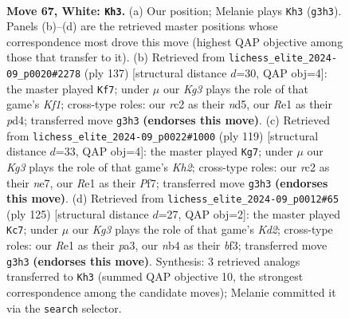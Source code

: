 \documentclass[11pt]{article}
\begin{document}
\clearpage

\begin{figure}[p]\centering
\begin{subfigure}{0.46\textwidth}\centering
\resizebox{\linewidth}{!}{%
\newchessgame
\chessboard[
  setfen={3R4/1p5p/1k4pP/p4p2/1n3P2/6K1/2r5/4R3 w - - 21 67},
  showmover=false,
  pgfstyle=straightmove, color=movearrow, markmove={g3-h3}
]}
\caption{}
\end{subfigure}\hfill
\begin{subfigure}{0.46\textwidth}\centering
\resizebox{\linewidth}{!}{%
\newchessgame
\chessboard[
  setfen={5k1K/7P/p7/P2N4/2pP4/2P5/1P6/8 b - - 0 69},
  showmover=false,
  pgfstyle=straightmove, color=movearrow, markmove={f8-f7}
]}
\caption{}
\end{subfigure}
\\[4pt]
\begin{subfigure}{0.46\textwidth}\centering
\resizebox{\linewidth}{!}{%
\newchessgame
\chessboard[
  setfen={8/4Np1k/7p/P1n3pP/8/5KP1/5P2/8 b - - 2 60},
  showmover=false,
  pgfstyle=straightmove, color=movearrow, markmove={h7-g7}
]}
\caption{}
\end{subfigure}\hfill
\begin{subfigure}{0.46\textwidth}\centering
\resizebox{\linewidth}{!}{%
\newchessgame
\chessboard[
  setfen={8/3k4/1p2p3/4P3/1KPP4/P4B2/1P6/1b6 b - - 4 63},
  showmover=false,
  pgfstyle=straightmove, color=movearrow, markmove={d7-c7}
]}
\caption{}
\end{subfigure}
\caption{\textbf{Move 67, White: \texttt{Kh3}.} (a) Our position; Melanie plays \texttt{Kh3} (\texttt{g3h3}). Panels (b)--(d) are the retrieved master positions whose correspondence most drove this move (highest QAP objective among those that transfer to it). (b) Retrieved from \texttt{lichess\_elite\_2024-09\_p0020\#2278} (ply 137) [structural distance $d$=30, QAP obj=4]: the master played \texttt{Kf7}; under $\mu$ our \emph{Kg3} plays the role of that game's \emph{Kf1}; cross-type roles: our \emph{r}c2 as their \emph{n}d5, our \emph{R}e1 as their \emph{p}d4; transferred move \texttt{g3h3} \textbf{(endorses this move)}. (c) Retrieved from \texttt{lichess\_elite\_2024-09\_p0022\#1000} (ply 119) [structural distance $d$=33, QAP obj=4]: the master played \texttt{Kg7}; under $\mu$ our \emph{Kg3} plays the role of that game's \emph{Kh2}; cross-type roles: our \emph{r}c2 as their \emph{n}e7, our \emph{R}e1 as their \emph{P}f7; transferred move \texttt{g3h3} \textbf{(endorses this move)}. (d) Retrieved from \texttt{lichess\_elite\_2024-09\_p0012\#65} (ply 125) [structural distance $d$=27, QAP obj=2]: the master played \texttt{Kc7}; under $\mu$ our \emph{Kg3} plays the role of that game's \emph{Kd2}; cross-type roles: our \emph{R}e1 as their \emph{p}a3, our \emph{n}b4 as their \emph{b}f3; transferred move \texttt{g3h3} \textbf{(endorses this move)}. Synthesis: 3 retrieved analogs transferred to \texttt{Kh3} (summed QAP objective 10, the strongest correspondence among the candidate moves); Melanie committed it via the \texttt{search} selector.}
\label{fig:thought-m132}
\end{figure}
\end{document}

